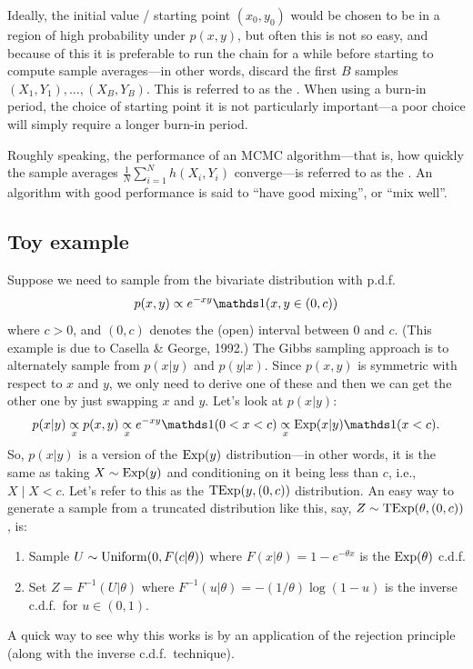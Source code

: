 \documentclass[12pt]{article}
\begin{document}
Ideally, the initial value / starting point $(x_0,y_0)$ would be chosen to be in a region of high probability under $p(x,y)$, but often this
is not so easy, and because of this it is preferable to run the chain for a while before starting to compute sample averages---in other
words, discard the first $B$ samples $(X_1,Y_1),\ldots,(X_B,Y_B)$. This is referred to as the .
When using a burn-in period, the choice of starting point it is not particularly
important---a poor choice will simply require a longer burn-in period.

Roughly speaking, the performance of an MCMC algorithm---that is, how quickly the sample averages $\frac{1}{N}\sum_{i = 1}^N h(X_i,Y_i)$
converge---is referred to as the . An algorithm with good performance is said to ``have good mixing'', or ``mix well''.


\subsection{Toy example}
\label{section:toy}
Suppose we need to sample from the bivariate distribution with p.d.f.\
$$p(x,y) \propto e^{-x y}\I(x,y\in (0, c))$$
where $c>0$, and $(0,c)$ denotes the (open) interval between $0$ and $c$. 
(This example is due to Casella \& George, 1992.)
The Gibbs sampling approach is to alternately sample from $p(x|y)$ and $p(y|x)$.  Since $p(x,y)$ is
symmetric with respect to $x$ and $y$, we only need to derive one of these and then we can get the other one by just swapping $x$ and $y$.
Let's look at $p(x|y)$:
$$p(x|y) \underset{x}{\propto} p(x,y) \underset{x}{\propto} e^{-x y}\I(0<x<c)\underset{x}{\propto} \Exp(x|y)\I(x<c). $$
So, $p(x|y)$ is a \term{truncated} version of the $\operatorname*{Exp}(y)$ distribution---in other words, it is the same as taking $X\sim\operatorname*{Exp}(y)$ and
conditioning on it being less than $c$, i.e., $X\mid X<c$.
Let's refer to this as the $\operatorname*{TExp}(y,(0,c))$ distribution.
An easy way to generate a sample from a truncated distribution like this, say, $Z\sim\operatorname*{TExp}(\theta,(0,c))$, is:
\begin{enumerate}
    \item Sample $U\sim \operatorname*{Uniform}(0,F(c|\theta))$ where $F(x|\theta) = 1-e^{-\theta x}$ is the $\operatorname*{Exp}(\theta)$ c.d.f.
    \item Set $Z = F^{-1}(U|\theta)$ where $F^{-1}(u|\theta) = -(1/\theta)\log(1 - u)$ is the inverse c.d.f.\ for $u\in(0,1)$.
\end{enumerate}
A quick way to see why this works is by an application of the rejection principle (along with the inverse c.d.f.\ technique).
\end{document}
